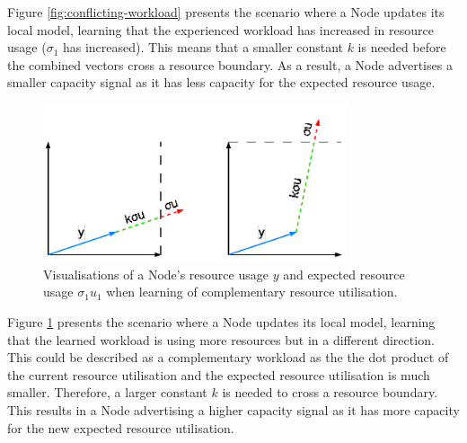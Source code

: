 Figure \ref{fig:conflicting-workload} presents the scenario where a Node updates
its local model, learning that the experienced workload has increased in
resource usage ($\sigma_1$ has increased). This means that a smaller constant
$k$ is needed before the combined vectors cross a resource boundary. As a
result, a Node advertises a smaller capacity signal as it has less capacity for
the expected resource usage.

\begin{figure}[ht]
    \centering
    \includegraphics[width=0.8\textwidth]{images/complementary-workload.pdf}
    \caption{Visualisations of a Node's resource usage $y$ and expected resource
    usage $\sigma_1 u_1$ when learning of complementary resource utilisation.}
    \label{fig:complementary-workload}
\end{figure}

Figure \ref{fig:complementary-workload} presents the scenario where a Node updates
its local model, learning that the learned workload is using more resources but
in a different direction. This could be described as a complementary workload as
the the dot product of the current resource utilisation and the expected
resource utilisation is much smaller. Therefore, a larger constant $k$ is needed
to cross a resource boundary. This results in a Node advertising a higher
capacity signal as it has more capacity for the new expected resource
utilisation.

